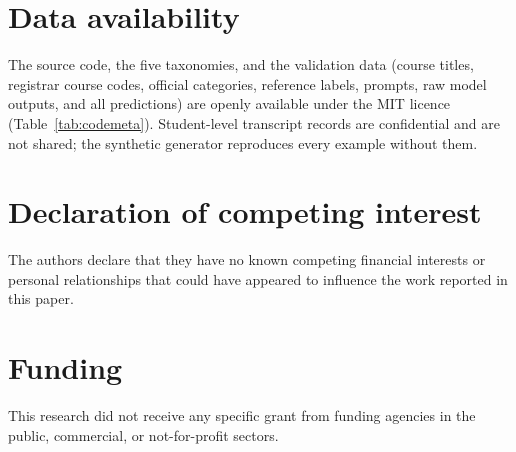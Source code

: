 \documentclass[preprint,12pt,a4paper]{elsarticle}
\begin{document}
\section*{Data availability}
The source code, the five taxonomies, and the validation data (course titles, registrar course codes, official categories, reference labels, prompts, raw model outputs, and all predictions) are openly available under the MIT licence (Table~\ref{tab:codemeta}). Student-level transcript records are confidential and are not shared; the synthetic generator reproduces every example without them.

\section*{Declaration of competing interest}
The authors declare that they have no known competing financial interests or personal relationships that could have appeared to influence the work reported in this paper.

\section*{Funding}
This research did not receive any specific grant from funding agencies in the public, commercial, or not-for-profit sectors.



\end{document}
